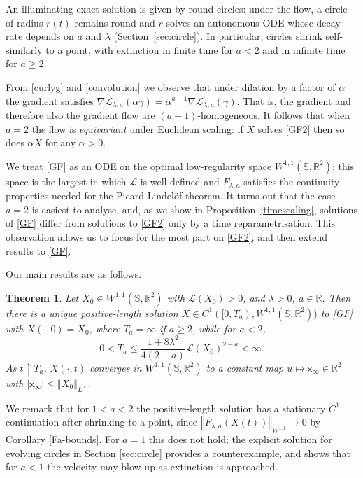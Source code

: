 \documentclass[a4paper,11pt]{amsart}
\newtheorem{theorem}{Theorem}[section]
\theoremstyle{definition}\newtheorem*{definition}{Definition}
\theoremstyle{definition} \newtheorem{proposition}[theorem]{Proposition}
\theoremstyle{definition}\newtheorem{lemma}[theorem]{Lemma}
\theoremstyle{definition}\newtheorem{corollary}[theorem]{Corollary}
\theoremstyle{definition}\newtheorem{example}{Example}
\theoremstyle{remark}\newtheorem*{remark}{Remark}
\def\R{\mathbb{R}}
\def\S{\mathbb{S}}
\def\x{\mathsf{x}}
\newcommand{\norm}[1]{{\left \Vert {#1}\right \Vert}}
\newcommand{\abs}[1]{\left | {#1}\right |}
\def\length{\mathcal L}
\renewcommand{\L}{\length}
\begin{document}
An illuminating exact solution is given by round circles: under the flow, a circle of radius $r(t)$ remains round and $r$ solves an autonomous ODE whose decay rate depends on $a$ and $\lambda$ (Section~\ref{sec:circle}). In particular, circles shrink self-similarly to a point, with extinction in finite time for $a<2$ and in infinite time for $a\ge 2$.

From \eqref{curlyg} and \eqref{convolution} we observe that under dilation by a factor of $\alpha$ the gradient satisfies $\nabla\L_{\lambda,a}(\alpha \gamma)=\alpha^{a-1} \nabla\L_{\lambda,a}(\gamma)$. That is, the gradient and therefore also the gradient flow are $(a-1)$-homogeneous. It follows that when $a=2$ the flow is \emph{equivariant} under Euclidean scaling: if $X$ solves \eqref{GF2} then so does $\alpha X$ for any $\alpha>0$.

We treat \eqref{GF} as an ODE on the optimal low-regularity space $W^{1,1}(\S,\R^2)$: this space is
the largest in which $\L$ is well-defined and $F_{\lambda,a}$ satisfies the continuity properties needed for the Picard-Lindel\"of theorem. It turns out that the case $a=2$ is easiest to analyse, and, as we show in Proposition~\ref{timescaling}, solutions of \eqref{GF} differ from solutions to \eqref{GF2} only by a time reparametrisation. This observation allows us to focus for the most part on \eqref{GF2}, and then extend results to \eqref{GF}.

\medskip

Our main results are as follows.

\begin{theorem}\label{thm:main1}
Let $X_0\in W^{1,1}(\S,\R^2)$ with $\length(X_0)>0$, and $\lambda>0$, $a\in\R$. Then there is a unique positive-length solution $X\in C^1([0,T_a),W^{1,1}(\S,\R^2))$ to \eqref{GF} with $X(\cdot,0)=X_0$, where 
$T_a=\infty$ if $a\geq 2$, while for $a<2$, 
\[ 0<T_a \leq \frac{1+8\lambda^2}{4(2-a)}\length(X_0)^{2-a}<\infty.
\]
As $t\uparrow T_a$, $X(\cdot,t)$ converges in $W^{1,1}(\S,\R^2)$ to a constant map $u\mapsto \x_\infty \in \R^2$ with ${\abs{\x_\infty}\leq \norm{X_0}_{L^\infty}}$. 
\end{theorem}

We remark that for $1<a<2$ the positive-length solution has a stationary $C^1$ continuation after shrinking to a point, since $\norm{F_{\lambda,a}(X(t))}_{W^{1,1}}\to 0$ by Corollary \ref{Fa-bounds}. For $a=1$ this does not hold; the explicit solution for evolving circles in Section \ref{sec:circle} provides a counterexample, and shows that for $a<1$ the velocity may blow up as extinction is approached.  
\end{document}
